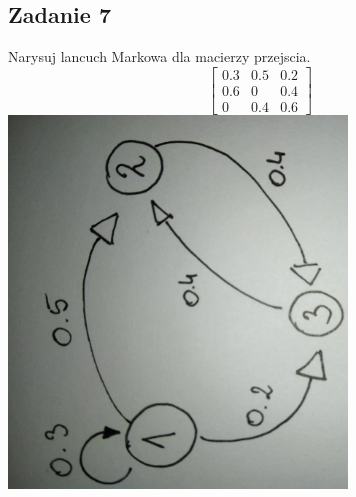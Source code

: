 \subsection{Zadanie 7}
Narysuj lancuch Markowa dla macierzy przejscia.
$$
\left[
\begin{array}{ccc}
0.3 & 0.5 & 0.2 \\
0.6 & 0 & 0.4 \\
0 & 0.4 & 0.6 
\end{array}
\right]
$$
\centering
\includegraphics[width=90mm, angle =270]{./tydzien_09/markow.jpg}